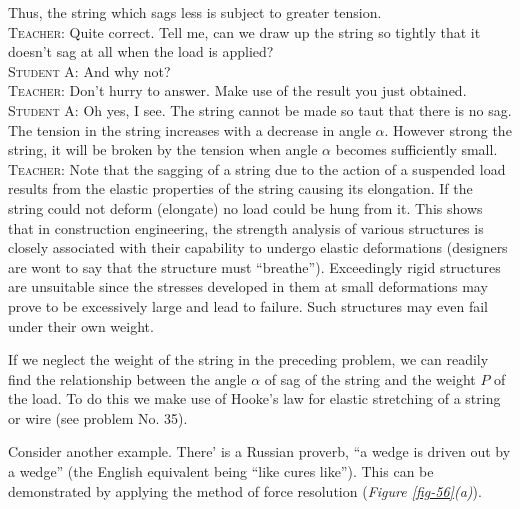 \documentclass[a4paper,sfsidenotes]{tufte-book}
\begin{document}
Thus, the string which sags less is subject to greater tension.
\\
\textsc{Teacher:} Quite correct. Tell me, can we draw up the string so tightly that it doesn't sag at all when the load is applied?
\\
\textsc{Student A:} And why not?
\\
\textsc{Teacher:} Don't hurry to answer. Make use of the result you just obtained.
\\
\textsc{Student A:} Oh yes, I see. The string cannot be made so taut that there is no sag. The tension in the string increases with a decrease in angle $\alpha$. However strong the string, it will be broken by the tension when angle $\alpha$ becomes sufficiently small.
\\
\textsc{Teacher:} Note that the sagging of a string due to the action of a suspended load results from the elastic properties of the string causing its elongation. If the string could not deform (elongate) no load could be hung from it. This shows that in construction engineering, the strength analysis of various structures is closely associated with their capability to undergo elastic deformations (designers are wont to say that the structure must ``breathe''). Exceedingly rigid structures are unsuitable since the stresses developed in them at small deformations may prove to be excessively large and lead to failure. Such structures may even fail under their own weight.

If we neglect the weight of the string in the preceding problem, we can readily find the relationship between the angle $\alpha$ of sag of the string and the weight $P$ of the load. To do this we make use of Hooke's law for elastic stretching of a string or wire (see problem No. 35). 

Consider another example. There' is a Russian proverb, ``a wedge is driven out by a wedge'' (the English equivalent being ``like cures like''). This can be demonstrated by applying the method of force resolution (\emph{Figure \ref{fig-56}(a)}). 
\end{document}
